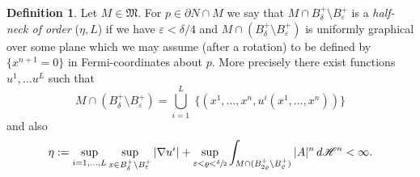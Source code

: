 \documentclass[JEP,XML,SOM,Unicode]{cedram}
\theoremstyle{definition}
\newtheorem{definition}[thm]{Definition}
\newcommand{\h}{\mathscr{H}}
\let\D\nabla
\let\eps\varepsilon
\begin{document}
\begin{definition}\label{neckdef_nonc_boundary}
Let $M\in \mathfrak{M}$. For $p\in \partial N\cap M$ we say that $M\cap B^{+}_\delta\setminus B^{+}_{\eps}$ is a \emph{half-neck of order} ($\eta, L$) if we have $\eps < \delta/4$ and $M\cap (B_\delta^+\setminus B_{\eps}^+)$ is uniformly graphical over some plane which we may assume (after a rotation) to be defined by $\{x^{n+1}=0\}$ in Fermi-coordinates about $p$. More precisely there exist functions $u^1,\dots u^L$ such that
\begin{equation*}
M\cap (B_\delta^+ \setminus B_{\eps}^+) = \bigcup_{i=1}^L \; \{(x^1,\dots , x^n, u^i(x^1,\dots, x^n))\}
\end{equation*}
and also
\begin{equation}
\eta:=\sup_{i=1,\ldots,L}\sup_{x\in B^+_\delta \setminus B^+_{\eps}} |\D u^i|+ \sup_{\eps< \varrho < \sfrac{\delta}{2}} \int_{M \cap (B^+_{2\varrho}\setminus B^+_\varrho)} |A|^n \, d\h^n < \infty.
\end{equation}
\end{definition}
\end{document}
